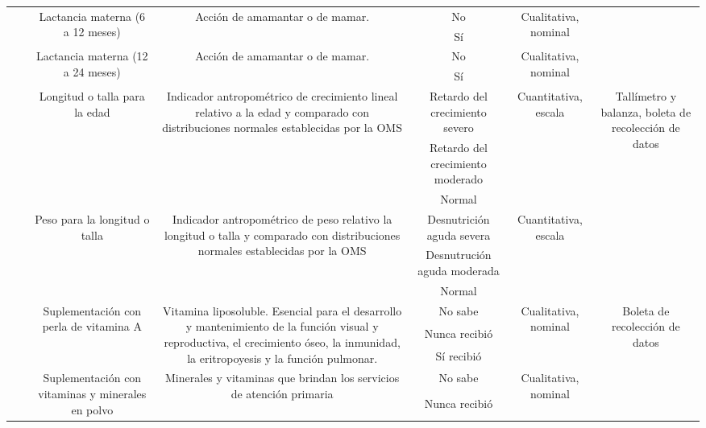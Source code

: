 \documentclass[11pt,letterpaper]{report}
\begin{document}
\begin{landscape}
\begin{longtable}{|c|c|c|c|c|c|c|}
 &  & \multirow{2}{*}{Lactancia materna (6 a 12 meses)} & \multirow{2}{*}{Acción de amamantar o de mamar.} & No & \multirow{2}{*}{Cualitativa, nominal} &  \\ \cline{5-5}
 &  &  &  & Sí &  &  \\ \cline{3-6}
 &  & \multirow{2}{*}{Lactancia materna (12 a 24 meses)} & \multirow{2}{*}{Acción de amamantar o de mamar.} & No & \multirow{2}{*}{Cualitativa, nominal} &  \\ \cline{5-5}
 &  &  &  & Sí &  &  \\ \cline{3-7} 
 &  & \multirow{3}{*}{Longitud o talla para la edad} & \multirow{3}{*}{Indicador antropométrico de crecimiento lineal relativo a la edad y comparado con distribuciones normales establecidas por la OMS} & Retardo del crecimiento severo & \multirow{3}{*}{Cuantitativa, escala} & \multirow{6}{*}{Tallímetro y balanza, boleta de recolección de datos} \\ \cline{5-5}
 &  &  &  & Retardo del crecimiento moderado &  &  \\ \cline{5-5}
 &  &  &  & Normal &  &  \\ \cline{3-6}
 &  & \multirow{3}{*}{Peso para la longitud o talla} & \multirow{3}{*}{Indicador antropométrico de peso relativo la longitud o talla y comparado con distribuciones normales establecidas por la OMS} & Desnutrición aguda severa & \multirow{3}{*}{Cuantitativa, escala} &  \\ \cline{5-5}
 &  &  &  & Desnutrución aguda moderada &  &  \\ \cline{5-5}
 &  &  &  & Normal &  &  \\ \cline{3-7} 
 &  & \multirow{3}{*}{Suplementación con perla de vitamina A} & \multirow{3}{*}{Vitamina liposoluble. Esencial para el desarrollo y mantenimiento de la función visual y reproductiva, el crecimiento óseo, la inmunidad, la eritropoyesis y la función pulmonar.} & No sabe & \multirow{3}{*}{Cualitativa, nominal} & \multirow{8}{*}{Boleta de recolección de datos} \\ \cline{5-5}
 &  &  &  & Nunca recibió &  &  \\ \cline{5-5}
 &  &  &  & Sí recibió &  &  \\ \cline{3-6}
 &  & \multirow{3}{*}{Suplementación con vitaminas y minerales en polvo} & \multirow{3}{*}{Minerales y vitaminas que brindan los servicios de atención primaria} & No sabe & \multirow{3}{*}{Cualitativa, nominal} &  \\ \cline{5-5}
 &  &  &  & Nunca recibió &  &  \\ \cline{5-5}

\end{longtable}
\end{landscape}
\end{document}
